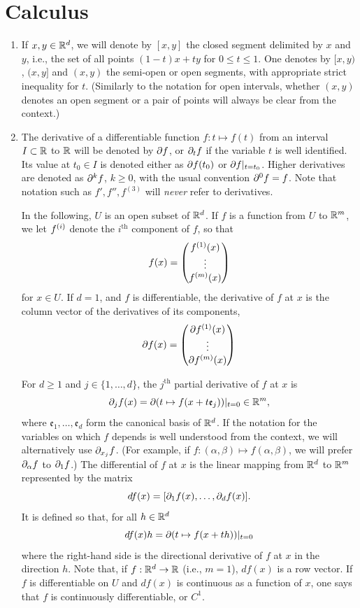 \section{Calculus}
\begin{enumerate}[label={\bf \arabic*.}]
 \item 
 If $x,y\in {\mathbb{R}}^d$, we will denote by $[x,y]$ the closed segment delimited by $x$ and $y$, i.e., the set of all points $(1-t) x + t y$ for $0\leq t \leq 1$. One denotes by $[x,y)$, $(x,y]$ and $(x,y)$ the semi-open or open segments, with appropriate strict inequality for $t$. (Similarly to the notation for open intervals, whether $(x,y)$ denotes an open segment or a pair of points will always be clear from the context.)
 

\item The derivative of  a differentiable function $f: t \mapsto f(t)$ from an interval $I\subset {\mathbb{R}}$ to ${\mathbb{R}}$ will be denoted by $\partial f$, or $\partial_t f$ if the variable $t$ is well identified. Its value at $t_0\in I$ is denoted either as $\partial f(t_0)$ or $\partial f{|_{t=t_0}}$.  Higher derivatives are denoted as $\partial^k f$, $k\geq 0$, with the usual convention $\partial^0f = f$. Note that notation such as $f', f'', f^{(3)}$ will {\em never} refer to derivatives.

In the following, $U$ is an open subset of ${\mathbb{R}}^d$.
If $f$ is a function from $U$ to ${\mathbb{R}}^m$, we let $f^{(i)}$ denote the $i^{\mathrm{th}}$ component of $f$, so that
\[
f(x) = \begin{pmatrix}
f^{(1)}(x)\\
\vdots\\
f^{(m)}(x)
\end{pmatrix}
\]
for  $x\in U$. If $d=1$, and $f$ is differentiable, the derivative of $f$ at $x$ is the column vector of the derivatives of its components,   
\[
\partial f(x) = \begin{pmatrix}
\partial f^{(1)}(x)\\
\vdots\\
\partial f^{(m)}(x)
\end{pmatrix}
\]


For $d\geq 1$ and $j\in \{1,\ldots, d\}$, the $j^{\mathrm{th}}$ partial derivative of $f$ at $x$ 
is
\[
\partial_j f(x) = \partial(t\mapsto f(x+t \mathfrak e_j))|_{t=0} \in {\mathbb{R}}^m,
\]
where $\mathfrak e_1, \ldots, \mathfrak e_d$ form  the canonical basis of ${\mathbb{R}}^d$.
If the notation for the variables on which $f$ depends is well understood from the context, we will alternatively use $\partial_{x_j} f$. (For example, if $f: (\alpha, \beta) \mapsto f(\alpha, \beta)$, we will prefer $\partial_\alpha f$ to $\partial_1f$.) The differential of $f$ at $x$ is the linear mapping from ${\mathbb{R}}^d$ to ${\mathbb{R}}^m$ represented by the matrix
\[
d\!f(x) = [\partial_1f(x), \ldots, \partial_d f(x)].
\]
 It is defined so that, for all $h\in {\mathbb{R}}^d$
\[
d\!f(x) h = \partial(t\mapsto f(x+th))|_{t=0}
\]
where the right-hand side is the directional derivative of $f$ at $x$ in the direction $h$. Note that, if $f:{\mathbb{R}}^d \to {\mathbb{R}}$ (i.e., $m=1$), $df(x)$ is a row vector. If $f$ is differentiable on $U$ and $df(x)$ is continuous as a function of $x$, one says that $f$ is continuously differentiable, or $C^1$. 


\end{enumerate}

